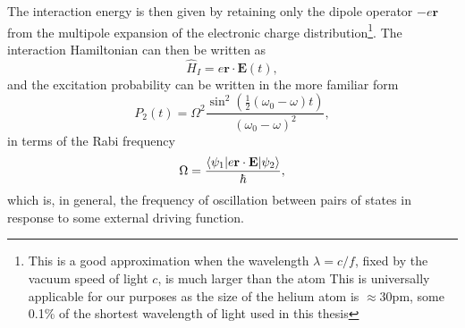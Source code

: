 	The interaction energy is then given by retaining only the dipole operator $-e\textbf{r}$ from the multipole expansion of the electronic charge distribution\footnote{This is a good approximation when the wavelength $\lambda = c/f$, fixed by the vacuum speed of light $c$, is much larger than the atom This is universally applicable for our purposes as the size of the helium atom is $\approx 30$pm, some 0.1\% of the shortest wavelength of light used in this thesis}.
	The interaction Hamiltonian can then be written as
	\begin{equation}
		\hat{H}_I = e\textbf{r}\cdot\textbf{E}(t),
	\end{equation}
	and the excitation probability can be written in the more familiar form \cite{FootAtomic,BinneyBook}
	\begin{equation}
		P_2(t) = \Omega^2 \frac{\sin^2(\frac{1}{2}(\omega_0-\omega)t)}{(\omega_0-\omega)^2},
		\label{eqn:transition_prob}
	\end{equation}
	in terms of the Rabi frequency
	\begin{equation}
		\Omega = \frac{\langle\psi_1|e\textbf{r}\cdot\textbf{E}|\psi_2\rangle}{\hbar},
	\end{equation}
	which is, in general, the frequency of oscillation between pairs of states in response to some external driving function.

